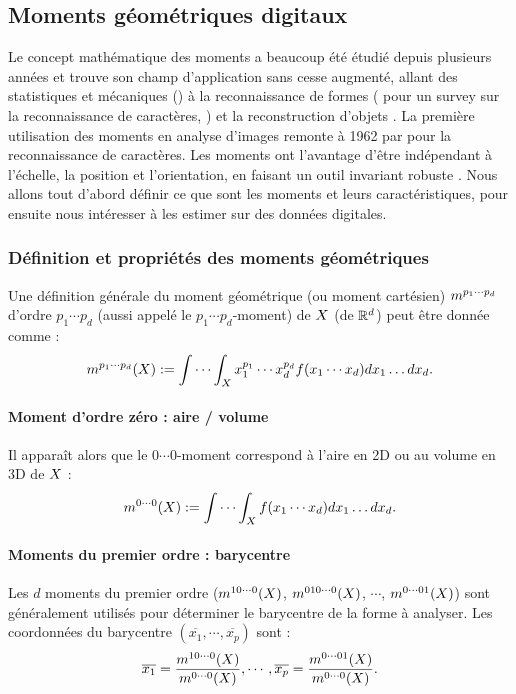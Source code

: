 \subsection{Moments géométriques digitaux}
%
Le concept mathématique des moments a beaucoup été étudié depuis plusieurs
années et trouve son champ d'application sans cesse augmenté, allant des
statistiques et mécaniques () \cite{} à la
reconnaissance de formes ( pour un survey sur la
reconnaissance de caractères, \cite{}) et la reconstruction d'objets \cite{Ghorbel2005}.
La première utilisation des moments en analyse d'images remonte à 1962 par
 pour la reconnaissance de caractères.
%
Les moments ont l'avantage d'être indépendant à l'échelle, la position et
l'orientation, en faisant un outil invariant robuste \cite{}. Nous allons tout
d'abord définir ce que sont les moments et leurs caractéristiques, pour ensuite
nous intéresser à les estimer sur des données digitales.
%
%
\subsubsection{Définition et propriétés des moments géométriques}%
\label{sec:definitions-moments}
%
Une définition générale du moment géométrique (ou moment cartésien) $m^{p_1
\cdots p_d}$ d'ordre $p_1 \cdots p_d$ (aussi appelé le $p_1 \cdots p_d$-moment)
de $X$ (de $\mathbb{R}^d$) peut être donnée comme :
%
\begin{equation}
  m^{p_1 \cdots p_d}(X) := \idotsint_{X} x_1^{p_1} \cdots x_d^{p_d} f(x_1 \cdots x_d) dx_1 \ldots dx_d.
\end{equation}
%
\paragraph{Moment d'ordre zéro : aire / volume}
%
Il apparaît alors que le $0\cdots0$-moment correspond à l'aire en 2D ou au
volume en 3D de $X$ :
%
\begin{equation}
  m^{0 \cdots 0}(X) := \idotsint_{X} f(x_1 \cdots x_d) dx_1 \ldots dx_d.
\end{equation}
%
\paragraph{Moments du premier ordre : barycentre}
%
Les $d$ moments du premier ordre ($m^{1 0 \cdots 0}(X)$, $m^{0 1 0
\cdots 0}(X)$, $\cdots$, $m^{0 \cdots 0 1}(X)$) sont généralement
utilisés pour déterminer le barycentre de la forme à analyser. Les coordonnées
du barycentre $(\overline{x_1}, \cdots, \overline{x_p})$ sont :
%
\begin{equation}
  \overline{x_1} = \frac{m^{1 0 \cdots 0}(X)}{m^{0 \cdots 0}(X)}, \cdots, \overline{x_p} = \frac{m^{0 \cdots 0 1}(X)}{m^{0 \cdots 0}(X)}.
\end{equation}
%
